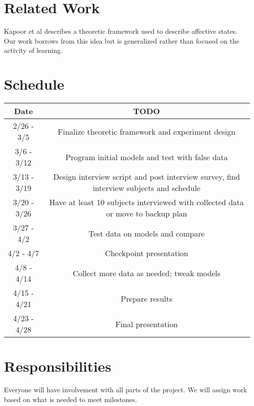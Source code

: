 \documentclass[12pt,letterpaper]{article}
\begin{document}

\section{Related Work}
Kapoor et al \cite{kapoor2001towards} describes a theoretic framework used to describe affective states.  Our work borrows from this idea but is generalized rather than focused on the activity of learning.

\newpage
\section{Schedule}

\begin{center}
\begin{tabular}{ c | c }
\bf{Date} & \bf{TODO} \\ \hline
2/26 - 3/5 & Finalize theoretic framework and experiment design\\
3/6 - 3/12 & Program initial models and test with false data\\
3/13 - 3/19 & Design interview script and post interview survey, find interview subjects and schedule\\
3/20 - 3/26 & Have at least 10 subjects interviewed with collected data or move to backup plan\\
3/27 - 4/2 & Test data on models and compare\\
4/2 - 4/7 & Checkpoint presentation\\
4/8 - 4/14 & Collect more data as needed; tweak models\\
4/15 - 4/21 & Prepare results\\
4/23 - 4/28 & Final presentation
\end{tabular}
\end{center}

\section{Responsibilities}
Everyone will have involvement with all parts of the project.  We will assign work based on what is needed to meet milestones.



\end{document}
